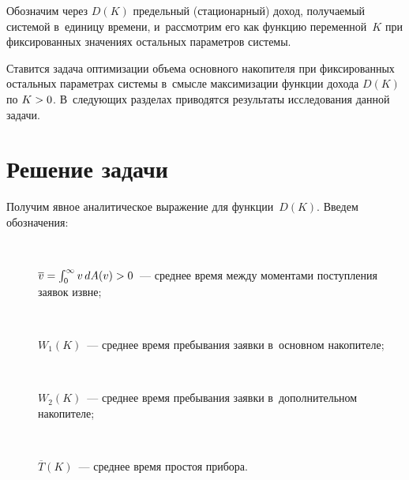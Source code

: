 \begin{multicols}{2}
  Обозначим через $D(K)$ предельный (стационарный) доход, получаемый 
системой в~единицу времени, и~рассмотрим его как функцию переменной~$K$ 
при фиксированных значениях остальных па\-ра\-мет\-ров системы. 
  
  Ставится задача оптимизации объема основного накопителя при 
фиксированных остальных параметрах системы в~смысле максимизации 
функции дохода $D(K)$ по $K\hm>0$. В~следующих разделах приводятся 
результаты исследования данной задачи.
  
  \section{Решение задачи}
  
  Получим явное аналитическое выражение для функции~$D(K)$. Введем 
обозначения:
  \begin{description}
  \item[\,]
  $\overline{v}=\int\nolimits_0^\infty v\,dA(v)\hm>0$~--- среднее время между 
моментами поступления заявок извне;
  \item[\,]
  $W_1(K)$~--- среднее время пребывания заявки в~основном накопителе;
  \item[\,]
  $W_2(K)$~--- среднее время пребывания заявки в~дополнительном 
накопителе;
  \item[\,]  
$\overline{T}(K)$~--- среднее время простоя прибора.
  \end{description}
  

\end{multicols}
